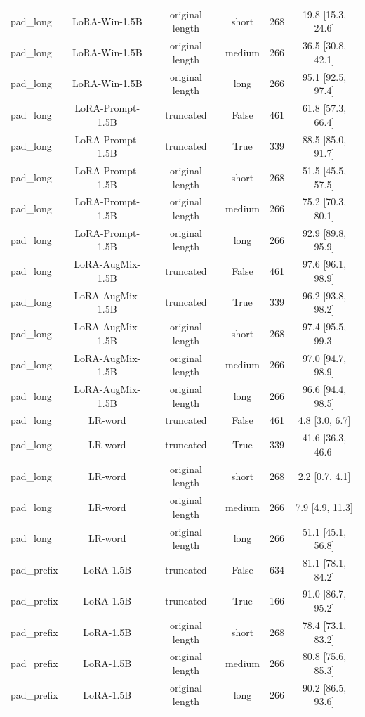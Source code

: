 \begin{table}[t]
\begin{tabular}{lccccc}
pad\_long & LoRA-Win-1.5B & original length & short & 268 & 19.8 [15.3, 24.6] \\
pad\_long & LoRA-Win-1.5B & original length & medium & 266 & 36.5 [30.8, 42.1] \\
pad\_long & LoRA-Win-1.5B & original length & long & 266 & 95.1 [92.5, 97.4] \\
pad\_long & LoRA-Prompt-1.5B & truncated & False & 461 & 61.8 [57.3, 66.4] \\
pad\_long & LoRA-Prompt-1.5B & truncated & True & 339 & 88.5 [85.0, 91.7] \\
pad\_long & LoRA-Prompt-1.5B & original length & short & 268 & 51.5 [45.5, 57.5] \\
pad\_long & LoRA-Prompt-1.5B & original length & medium & 266 & 75.2 [70.3, 80.1] \\
pad\_long & LoRA-Prompt-1.5B & original length & long & 266 & 92.9 [89.8, 95.9] \\
pad\_long & LoRA-AugMix-1.5B & truncated & False & 461 & 97.6 [96.1, 98.9] \\
pad\_long & LoRA-AugMix-1.5B & truncated & True & 339 & 96.2 [93.8, 98.2] \\
pad\_long & LoRA-AugMix-1.5B & original length & short & 268 & 97.4 [95.5, 99.3] \\
pad\_long & LoRA-AugMix-1.5B & original length & medium & 266 & 97.0 [94.7, 98.9] \\
pad\_long & LoRA-AugMix-1.5B & original length & long & 266 & 96.6 [94.4, 98.5] \\
pad\_long & LR-word & truncated & False & 461 & 4.8 [3.0, 6.7] \\
pad\_long & LR-word & truncated & True & 339 & 41.6 [36.3, 46.6] \\
pad\_long & LR-word & original length & short & 268 & 2.2 [0.7, 4.1] \\
pad\_long & LR-word & original length & medium & 266 & 7.9 [4.9, 11.3] \\
pad\_long & LR-word & original length & long & 266 & 51.1 [45.1, 56.8] \\
pad\_prefix & LoRA-1.5B & truncated & False & 634 & 81.1 [78.1, 84.2] \\
pad\_prefix & LoRA-1.5B & truncated & True & 166 & 91.0 [86.7, 95.2] \\
pad\_prefix & LoRA-1.5B & original length & short & 268 & 78.4 [73.1, 83.2] \\
pad\_prefix & LoRA-1.5B & original length & medium & 266 & 80.8 [75.6, 85.3] \\
pad\_prefix & LoRA-1.5B & original length & long & 266 & 90.2 [86.5, 93.6] \\

\end{tabular}
\end{table}
